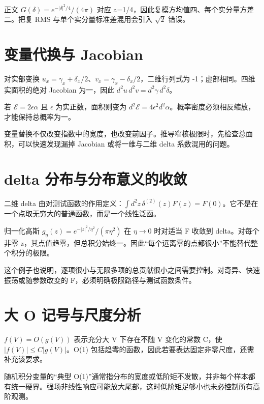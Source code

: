 \documentclass[UTF8,a4paper,zihao=-4,openany,fontset=fandol]{ctexbook}
\begin{document}
正文 $G(\delta)=e^{-|\delta|^2/4}/(4\pi)$ 对应 a=1/4，因此复模方均值四、每个实分量方差二。把复 RMS 与单个实分量标准差混用会引入 $\sqrt2$ 错误。



\section{变量代换与 Jacobian}\label{sec:B:3}


对实部变换 $u_x=\gamma_x+\delta_x/2$、$v_x=\gamma_x-\delta_x/2$，二维行列式为 -1；虚部相同。四维实面积的绝对 Jacobian 为一，因此 $d^2u\,d^2v=d^2\gamma\,d^2\delta$。



若 $\mathcal E=2\epsilon\alpha$ 且 $\epsilon$ 为实正数，面积则变为 $d^2\mathcal E=4\epsilon^2d^2\alpha$。概率密度必须相反缩放，才能保持总概率为一。



变量替换不仅改变指数中的宽度，也改变前因子。推导窄核极限时，先检查总面积，可以快速发现漏掉 Jacobian 或将一维与二维 delta 系数混用的问题。



\section{delta 分布与分布意义的收敛}\label{sec:B:4}


二维 delta 由对测试函数的作用定义：$\int d^2z\,\delta^{(2)}(z)F(z)=F(0)$。它不是在一个点取无穷大的普通函数，而是一个线性泛函。



归一化高斯 $g_\eta(z)=e^{-|z|^2/\eta^2}/(\pi\eta^2)$ 在 $\eta\to0$ 时对适当 F 收敛到 delta。对每个非零 z，其点值趋零，但总积分始终一。因此“每个远离零的点都很小”不能替代整个积分的极限。



这个例子也说明，逐项很小与无限多项的总贡献很小之间需要控制。对奇异、快速振荡或随参数改变的 F，必须明确极限路径与测试函数条件。



\section{大 O 记号与尺度分析}\label{sec:B:5}


$f(V)=O(g(V))$ 表示充分大 V 下存在不随 V 变化的常数 C，使 $|f(V)|\le C|g(V)|$。O(1) 包括趋零的函数，因此若要表达固定非零尺度，还需补充该要求。



随机积分变量的“典型 O(1)”通常指分布的宽度或低阶矩不发散，并非每个样本都有统一硬界。强场非线性响应可能放大尾部，这时低阶矩足够小也未必控制所有高阶观测。
\end{document}

